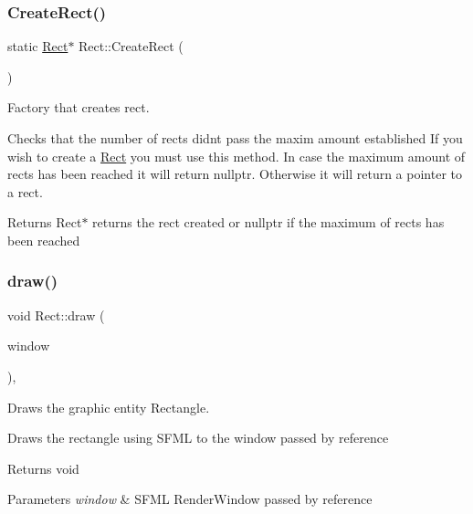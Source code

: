 \subsubsection{\texorpdfstring{Create\+Rect()}{CreateRect()}}
{\footnotesize\ttfamily static \hyperlink{class_rect}{Rect}$\ast$ Rect\+::\+Create\+Rect (\begin{DoxyParamCaption}{ }\end{DoxyParamCaption})\hspace{0.3cm}{\ttfamily [static]}}



Factory that creates rect. 

Checks that the number of rects didn\textquotesingle{}t pass the maxim amount established If you wish to create a \hyperlink{class_rect}{Rect} you must use this method. In case the maximum amount of rects has been reached it will return nullptr. Otherwise it will return a pointer to a rect.

\begin{DoxyReturn}{Returns}
Rect$\ast$ returns the rect created or nullptr if the maximum of rects has been reached 
\end{DoxyReturn}
\mbox{\label{class_rect_a57801edbfb2c000c631a610c59e7ff20}} 
\subsubsection{\texorpdfstring{draw()}{draw()}}
{\footnotesize\ttfamily void Rect\+::draw (\begin{DoxyParamCaption}\item[{sf\+::\+Render\+Window \&}]{window }\end{DoxyParamCaption})\hspace{0.3cm}{\ttfamily [override]}, {\ttfamily [virtual]}}



Draws the graphic entity Rectangle. 

Draws the rectangle using S\+F\+ML to the window passed by reference

\begin{DoxyReturn}{Returns}
void 
\end{DoxyReturn}

\begin{DoxyParams}{Parameters}
{\em window} & S\+F\+ML Render\+Window passed by reference \\
\hline
\end{DoxyParams}


